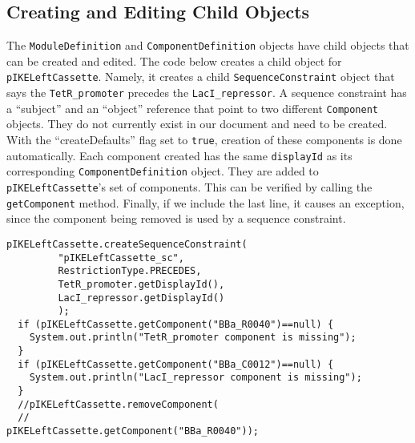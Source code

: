 


\subsection*{Creating and Editing Child Objects}
The \lstinline+ModuleDefinition+ and \lstinline+ComponentDefinition+ objects have child objects that can be created and edited.  The code below creates a child object for \lstinline+pIKELeftCassette+.
Namely, it creates a child \lstinline+SequenceConstraint+ object that says the \lstinline+TetR_promoter+ precedes the \lstinline+LacI_repressor+.  A sequence constraint has a
``subject'' and an ``object'' reference that point to two different \lstinline+Component+ objects. They do not currently exist in our document and need to be created. With the ``createDefaults'' flag
set to \lstinline+true+, creation of these components is done automatically.  Each component created has the same \lstinline+displayId+ as its corresponding \lstinline+ComponentDefinition+
object.  They are added to \lstinline+pIKELeftCassette+'s set of components. 
This can be verified by calling the \lstinline+getComponent+ method.  Finally, if we include the last line, it causes an exception, since the component being removed is used by a sequence constraint. 

\begin{minipage}{0.95\textwidth} 
\begin{lstlisting}[basicstyle=\footnotesize\ttfamily]
  pIKELeftCassette.createSequenceConstraint(
         "pIKELeftCassette_sc",
         RestrictionType.PRECEDES,
         TetR_promoter.getDisplayId(), 
         LacI_repressor.getDisplayId()
         );
  if (pIKELeftCassette.getComponent("BBa_R0040")==null) {
	System.out.println("TetR_promoter component is missing");
  }
  if (pIKELeftCassette.getComponent("BBa_C0012")==null) {
	System.out.println("LacI_repressor component is missing");
  }
  //pIKELeftCassette.removeComponent(
  //                          pIKELeftCassette.getComponent("BBa_R0040"));
\end{lstlisting}
\end{minipage}

